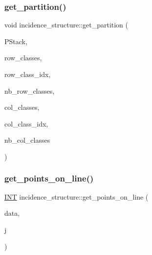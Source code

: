 \subsubsection{\texorpdfstring{get\+\_\+partition()}{get\_partition()}}
{\footnotesize\ttfamily void incidence\+\_\+structure\+::get\+\_\+partition (\begin{DoxyParamCaption}\item[{\mbox{\hyperlink{classpartitionstack}{partitionstack}} \&}]{P\+Stack,  }\item[{\mbox{\hyperlink{galois_8h_a09fddde158a3a20bd2dcadb609de11dc}{I\+NT}} $\ast$}]{row\+\_\+classes,  }\item[{\mbox{\hyperlink{galois_8h_a09fddde158a3a20bd2dcadb609de11dc}{I\+NT}} $\ast$}]{row\+\_\+class\+\_\+idx,  }\item[{\mbox{\hyperlink{galois_8h_a09fddde158a3a20bd2dcadb609de11dc}{I\+NT}} \&}]{nb\+\_\+row\+\_\+classes,  }\item[{\mbox{\hyperlink{galois_8h_a09fddde158a3a20bd2dcadb609de11dc}{I\+NT}} $\ast$}]{col\+\_\+classes,  }\item[{\mbox{\hyperlink{galois_8h_a09fddde158a3a20bd2dcadb609de11dc}{I\+NT}} $\ast$}]{col\+\_\+class\+\_\+idx,  }\item[{\mbox{\hyperlink{galois_8h_a09fddde158a3a20bd2dcadb609de11dc}{I\+NT}} \&}]{nb\+\_\+col\+\_\+classes }\end{DoxyParamCaption})}

\mbox{\label{classincidence__structure_a1baf0d372125123bf55d27dacc720bda}} 
\subsubsection{\texorpdfstring{get\+\_\+points\+\_\+on\+\_\+line()}{get\_points\_on\_line()}}
{\footnotesize\ttfamily \mbox{\hyperlink{galois_8h_a09fddde158a3a20bd2dcadb609de11dc}{I\+NT}} incidence\+\_\+structure\+::get\+\_\+points\+\_\+on\+\_\+line (\begin{DoxyParamCaption}\item[{\mbox{\hyperlink{galois_8h_a09fddde158a3a20bd2dcadb609de11dc}{I\+NT}} $\ast$}]{data,  }\item[{\mbox{\hyperlink{galois_8h_a09fddde158a3a20bd2dcadb609de11dc}{I\+NT}}}]{j }\end{DoxyParamCaption})}

